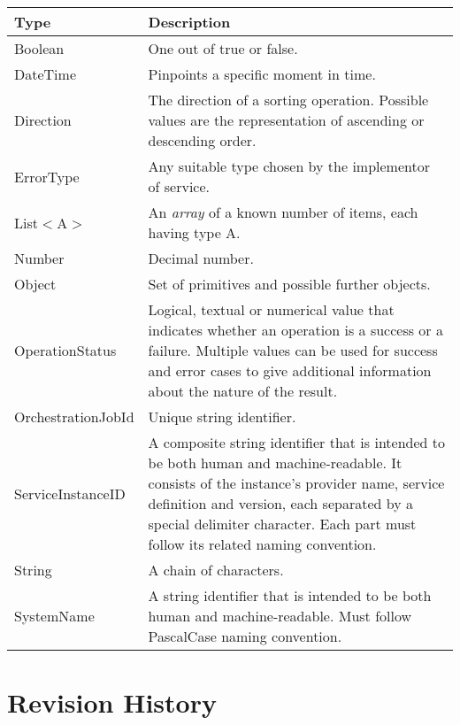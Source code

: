 \documentclass[a4paper]{arrowhead}
\newcommand{\pdef}[1]{{\textcolor{ArrowheadGrey}{#1\label{sec:model:primitives:#1}\label{sec:model:primitives:#1s}\label{sec:model:primitives:#1es}}}}
\begin{document}
\begin{table}[ht!]
\begin{tabularx}{\textwidth}{| p{4.3cm} | X |} \hline
\rowcolor{gray!33} Type & Description \\ \hline
\pdef{Boolean}          & One out of true or false. \\ \hline
\pdef{DateTime}         & Pinpoints a specific moment in time. \\ \hline
\pdef{Direction}        & The direction of a sorting operation. Possible values are the representation of ascending or descending order. \\ \hline
\pdef{ErrorType}        & Any suitable type chosen by the implementor of service. \\ \hline
\pdef{List}$<$A$>$      & An \textit{array} of a known number of items, each having type A. \\ \hline
\pdef{Number}           & Decimal number. \\ \hline
\pdef{Object}           & Set of primitives and possible further objects. \\ \hline
\pdef{OperationStatus}  & Logical, textual or numerical value that indicates whether an operation is a success or a failure. Multiple values can be used for success and error cases to give additional information about the nature of the result. \\ \hline
\pdef{OrchestrationJobId} & Unique string identifier. \\ \hline
\pdef{ServiceInstanceID} & A composite string identifier that is intended to be both human and machine-readable. It consists of the instance’s provider name, service definition and version, each separated by a special delimiter character. Each part must follow its related naming convention. \\ \hline
\pdef{String}           & A chain of characters. \\ \hline
\pdef{SystemName}             & A string identifier that is intended to be both human and machine-readable. Must follow PascalCase naming convention. \\ \hline
\end{tabularx}
\end{table}

\newpage




\newpage

\section{Revision History}
\end{document}

